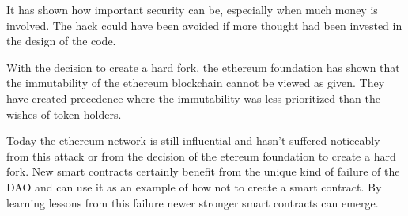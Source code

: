 \documentclass[a4paper, 11pt]{scrartcl}
\begin{document}
It has shown how important security can be, especially when much money is involved. The hack could have been avoided if more thought had been invested in the design of the code. 

With the decision to create a hard fork, the ethereum foundation has shown that the immutability of the ethereum blockchain cannot be viewed as given. They have created precedence where the immutability was less prioritized than the wishes of token holders.

Today the ethereum network is still influential and hasn't suffered noticeably from this attack or from the decision of the etereum foundation to create a hard fork. New smart contracts certainly benefit from the unique kind of failure of the DAO and can use it as an example of how not to create a smart contract. By learning lessons from this failure newer stronger smart contracts can emerge. 

\nocite{*}
\clearpage
\printbibliography[heading=bibintoc]
\end{document}

